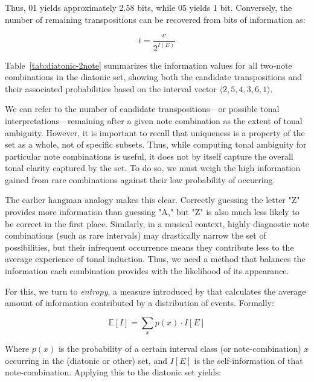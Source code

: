 \documentclass[10pt,twocolumn]{article}
\numberwithin{equation}{section} %
\begin{document}
    Thus, 01 yields approximately 2.58 bits, while 05 yields 1 bit.
    Conversely, the number of remaining transpositions can be recovered from bits of information as:

    \begin{equation}
        t = \frac{c}{2^{I(E)}}
        \label{eq:remaining_transpositions}
    \end{equation}

    Table~\ref{tab:diatonic-2note} summarizes the information values for all two‑note combinations in the diatonic set, showing both the candidate transpositions and their associated probabilities based on the interval vector $\langle 2,5,4,3,6,1\rangle$.

    

    We can refer to the number of candidate transpositions—or possible tonal interpretations—remaining after a given note combination as the extent of tonal ambiguity.
    However, it is important to recall that uniqueness is a property of the set as a whole, not of specific subsets.
    Thus, while computing tonal ambiguity for particular note combinations is useful, it does not by itself capture the overall tonal clarity captured by the set.
    To do so, we must weigh the high information gained from rare combinations against their low probability of occurring.

    The earlier hangman analogy makes this clear.
    Correctly guessing the letter "Z" provides more information than guessing "A," but "Z" is also much less likely to be correct in the first place.
    Similarly, in a musical context, highly diagnostic note combinations (such as rare intervals) may drastically narrow the set of possibilities, but their infrequent occurrence means they contribute less to the average experience of tonal induction.
    Thus, we need a method that balances the information each combination provides with the likelihood of its appearance.

    For this, we turn to \textit{entropy}, a measure introduced by \citet{shannon1948} that calculates the average amount of information contributed by a distribution of events.
    Formally:

    \begin{equation}
        \mathbb{E}[I] = \sum_{x} p(x) \cdot I[E]
        \label{eq:expected-info}
    \end{equation}

    Where $p(x)$ is the probability of a certain interval class (or note-combination) $x$ occurring in the (diatonic or other) set, and $I[E]$ is the self-information of that note-combination.
    Applying this to the diatonic set yields:
\end{document}
